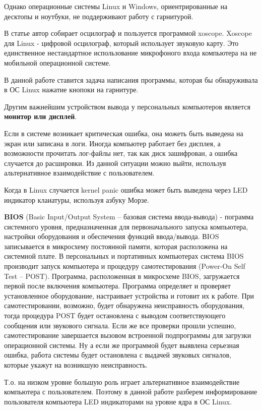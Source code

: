Однако операционные системы Linux и Windows, ориентрированные на десктопы и ноутбуки, не поддерживают работу с гарнитурой. 

В статье \cite{gambiarraemcasa} автор собирает осцилограф и пользуется программой xoscope. Xoscope для Linux - цифровой осцилограф, который использует звуковую карту. Это единственное нестандартное использование микрофоного входа компьютера на не мобильной операционной системе.

В данной работе ставится задача написания программы, которая бы обнаруживала в ОС Linux нажатие кнопоки на гарнитуре.  

Другим важнейшим устройством вывода у персональных компьютеров является \textbf{монитор или дисплей}.

Если в системе возникает критическая ошибка, она можеть быть выведена на экран или записана в логи. Иногда компьютер работает без дисплея, а возможности прочитать лог-файлы нет, так как диск зашифрован, а ошибка случается до расшировки. Из данной ситуации можно выйти, используя альтернативное взаимодействие с пользователем.

Когда в Linux случается kernel panic ошибка может быть выведена через LED индикатор клаиатуры, используя азбуку Морзе. \cite{lwn-mckp}

\textbf{BIOS} (Basic Input/Output System – базовая система ввода-вывода) - пограмма системного уровня, предназначенная для первоначального запуска компьютера, настройки оборудования и обеспечения функций ввода/вывода. ВIOS записывается в микросхему постоянной памяти, которая расположена на системной плате. В персональных и портативных компьютерах система BIOS производит запуск компьютера и процедуру самотестирования (Power-On Self Test – POST). Программа, расположенная в микросхеме BIOS, загружается первой после включения компьютера. Программа определяет и проверяет установленное оборудование, настраивает устройства и готовит их к работе. При самотестировании, возможно, будет обнаружена неисправность оборудования, тогда процедура POST будет остановлена с выводом соответствующего сообщения или звукового сигнала. Если же все проверки прошли успешно, самотестирование завершается вызовом встроенной подпрограммы для загрузки операционной системы. Ну а если же программой будет выявлена серьезная ошибка, работа системы будет остановлена с выдачей звуковых сигналов, которые укажут на возникшую неисправность. \cite{allmbs-bios}

Т.о. на низком уровне большую роль играет альтернативное взаимодействие компьютера с пользователем. Поэтому в данной работе разберем информирование пользователя компьютера LED индикаторами на уровне ядра в ОС Linux.

